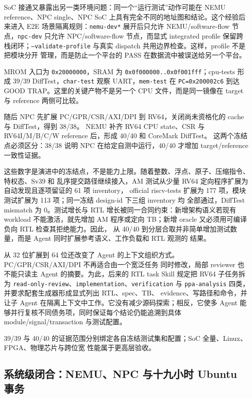 \documentclass[UTF8,a4paper,zihao=-4,oneside]{ctexart}
\begin{document}
SoC 接通又暴露出另一类环境问题：同一个“运行测试”动作可能在 NEMU reference、NPC single、NPC SoC
上具有完全不同的地址图和结论。这个经验后来进入 E2E 场景隔离规则：\texttt{nemu-dev*} 展开后只允许
NEMU/software-flow 节点，\texttt{npc-dev} 只允许 NPC/software-flow 节点，而显式 integrated profile
保留跨栈闭环；\texttt{--validate-profile} 与真实 dispatch 共用边界检查。这样，profile 不是把模块分开
管理，而是防止一个平台的 PASS 在数据流中被误送给另一个平台。

MROM 入口为 \texttt{0x20000000}，SRAM 为 \texttt{0x0f000000..0x0f001fff}；cpu-tests 形成
39/39 DiffTest，\texttt{char-test} 观察 UART，\texttt{mem-test} 在
\texttt{PC=0x200002c6} 到达 GOOD TRAP。这里的关键产物不是另一个 CPU 文件，而是同一镜像在 target
与 reference 两侧可比较。

随后 NPC 先扩展 PC/GPR/CSR/AXI/DPI 到 RV64，关闭尚未资格化的 cache 与 DiffTest，得到 38/38。
NEMU 补齐 RV64 CPU state、CSR 与 RV64I/M/B/C/W reference 后，形成 40/40 和 CoreMark DiffTest。
这两个冻结点必须区分：38/38 说明 NPC 在给定自测中运行，40/40 才增加 target/reference 一致性证据。

这些数字是演进中的冻结点，不是能力上限。随着整数、浮点、原子、压缩指令、特权态、Sv39 和
乱序提交路径继续接入，AM 测试从少量 RV64 定向程序扩展为自动发现且逐项留证的 61 项 inventory，
official riscv-tests 扩展为 177 项，模块测试扩展为 113 项；同一冻结 design-id 下三组 inventory 均
全部通过，DiffTest mismatch 为 0。测试增长与 RTL 增长被同一合同约束：新增架构语义若现有 workload
不能激活，就先增加 AM 程序或定向 TB；新增 oracle 又必须用可编译负向 RTL 检查其拒绝能力。因此，
从 40/40 到分层合取并非简单增加测试数量，而是 Agent 同时扩展参考语义、工作负载和 RTL 观测的
结果。

从 32 位扩展到 64 位还改变了 Agent 的上下文组织方式。PC/GPR/CSR/AXI/DPI 不再适合由一个宽泛任务
同时修改，局部 reviewer 也不能只读主 Agent 的摘要。为此，后来的 RTL task Skill 规定把 RV64 子任务拆为
\texttt{read-only-review}、\texttt{implementation}、\texttt{verification} 与 \texttt{ppa-analysis} 四类，
并要求配套生成器形成显式列出 RTL、spec、TB、
evidence、写路径和命令，并让子 Agent 在隔离上下文中工作。它没有减少源码探索；相反，它使多 Agent
能够并行复核不同债务项，同时保证每个结论仍能追溯到具体 module/signal/transaction 与测试配置。

39/39 与 40/40 的证据范围分别绑定各自冻结测试集和配置；SoC 全量、Linux、FPGA、物理芯片与跨位宽
性能属于更高层验收。

\subsection{系统级闭合：NEMU、NPC 与十九小时 Ubuntu 事务}
\end{document}
